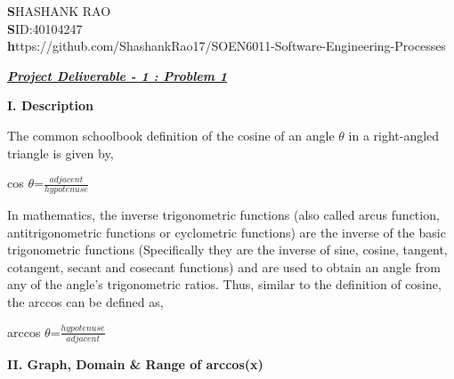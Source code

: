 \documentclass[12pt]{article}
\begin{document}
\begin{flushleft}
	\large\textbf SHASHANK RAO\\
	\large\textbf SID:40104247\\
	\small\textbf https://github.com/ShashankRao17/SOEN6011-Software-Engineering-Processes 
\end{flushleft}
\begin{center}
	\Large\textbf\textit\underline{Project Deliverable - 1 : Problem 1} 
	
\end{center}
\begin{flushleft}
	\Large\textbf{I. Description}
\end{flushleft}

		
		The common schoolbook definition of the cosine of an angle $\theta$ in a right-angled triangle is given by,
		
		\begin{center}
			\Large cos $\theta$=\Large $\frac{adjacent}{hypotenuse}$
		\end{center}
		
		In mathematics, the inverse trigonometric functions (also called arcus function, antitrigonometric functions or cyclometric functions) are the inverse of the basic trigonometric functions (Specifically they are the inverse of sine, cosine, tangent, cotangent, secant and cosecant functions) and are used to obtain an angle from any of the angle’s trigonometric ratios. Thus, similar to the definition of cosine, the arccos can be defined as,
		\begin{center}
			\Large arccos $\theta$=\Large$\frac{hypotenuse}{adjacent}$
		\end{center}
	
\begin{flushleft}
	\Large\textbf{II. Graph, Domain \& Range of arccos(x)}
\end{flushleft}
\end{document}
